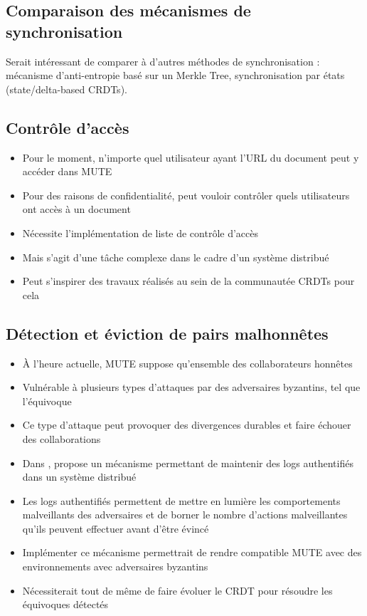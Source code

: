 \documentclass[12pt]{thesul}
\begin{document}
\subsection{Comparaison des mécanismes de synchronisation}

Serait intéressant de comparer à d'autres méthodes de synchronisation : mécanisme d'anti-entropie basé sur un Merkle Tree\cite{2007-dynamo, 2015-approximate-hash-based-set-reconciliation, 2017-anti-entropy-without-merkle-trees}, synchronisation par états (state/delta-based \acp{CRDT}).

\subsection{Contrôle d'accès}

\begin{itemize}
  \item Pour le moment, n'importe quel utilisateur ayant l'URL du document peut y accéder dans MUTE
  \item Pour des raisons de confidentialité, peut vouloir contrôler quels utilisateurs ont accès à un document
  \item Nécessite l'implémentation de liste de contrôle d'accès
  \item Mais s'agit d'une tâche complexe dans le cadre d'un système distribué
  \item Peut s'inspirer des travaux réalisés au sein de la communautée \acp{CRDT} \cite{2021-access-control-crdts, 2022-dist-access-control-pa} pour cela
\end{itemize}

\subsection{Détection et éviction de pairs malhonnêtes}

\begin{itemize}
  \item À l'heure actuelle, MUTE suppose qu'ensemble des collaborateurs honnêtes
  \item Vulnérable à plusieurs types d'attaques par des adversaires byzantins, tel que l'équivoque
  \item Ce type d'attaque peut provoquer des divergences durables et faire échouer des collaborations
  \item Dans \cite{2018-prunable-authenticated-log, 2021-these-vic}, \citeauthor{2021-these-vic} propose un mécanisme permettant de maintenir des logs authentifiés dans un système distribué
  \item Les logs authentifiés permettent de mettre en lumière les comportements malveillants des adversaires et de borner le nombre d'actions malveillantes qu'ils peuvent effectuer avant d'être évincé
  \item Implémenter ce mécanisme permettrait de rendre compatible MUTE avec des environnements avec adversaires byzantins
  \item Nécessiterait tout de même de faire évoluer le \ac{CRDT} pour résoudre les équivoques détectés
\end{itemize}
\end{document}
